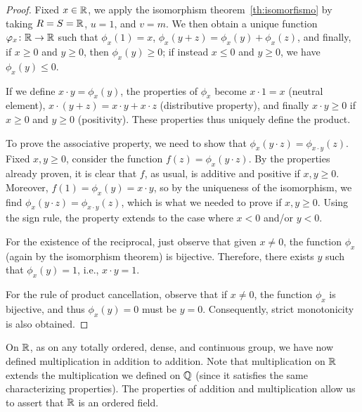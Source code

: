 \begin{proof}
Fixed $x\in {\mathbb R}$, we apply the isomorphism theorem~\ref{th:isomorfismo} by
taking $R=S={\mathbb R}$, $u=1$, and $v=m$. We then obtain a unique function
$\varphi_x\colon {\mathbb R}\to {\mathbb R}$ such that $\phi_x(1)=x$,
$\phi_x(y+z)=\phi_x(y)+\phi_x(z)$, and finally, if $x\ge 0$ and $y\ge 0$, then
$\phi_x(y)\ge 0$; if instead $x\le 0$ and $y\ge 0$, we have $\phi_x(y)\le 0$.

If we define $x\cdot y = \phi_x(y)$, the properties of $\phi_x$ become
 $x\cdot 1 = x$ (neutral element),  $x\cdot (y+z) = x\cdot y + x\cdot z$ (distributive
property),  and finally $x\cdot y\ge 0$ if $x\ge 0$
and $y\ge 0$ (positivity). These properties thus uniquely define the product.

 To prove the associative property, we need to show that $\phi_x(y\cdot z) = \phi_{x\cdot y}(z)$. Fixed $x,y\ge 0$, consider the function $f(z) = \phi_x(y\cdot z)$. By the properties already proven, it is clear that $f$, as usual, is additive and positive if $x,y\ge 0$. Moreover, $f(1) = \phi_x(y) = x\cdot y$, so by the uniqueness of the isomorphism, we find $\phi_x(y\cdot z) = \phi_{x\cdot y}(z)$, which is what we needed to prove if $x,y\ge 0$. Using the sign rule, the property extends to the case where $x<0$ and/or $y<0$.

 For the existence of the reciprocal, just observe that given $x\neq 0$, the function $\phi_x$ (again by the isomorphism theorem) is bijective. Therefore, there exists $y$ such that $\phi_x(y)=1$, i.e., $x\cdot y = 1$.

 For the rule of product cancellation, observe that if $x\neq 0$, the function $\phi_x$ is bijective, and thus $\phi_x(y)=0$ must be $y=0$. Consequently, strict monotonicity is also obtained.
\end{proof}

On ${\mathbb R}$, as on any totally ordered, dense, and continuous group, we have now
defined multiplication in addition to addition. Note that multiplication on
${\mathbb R}$ extends the multiplication we defined on ${\mathbb Q}$ (since it satisfies the
same characterizing properties). The properties of addition and multiplication
allow us to assert that ${\mathbb R}$ is an ordered field.

